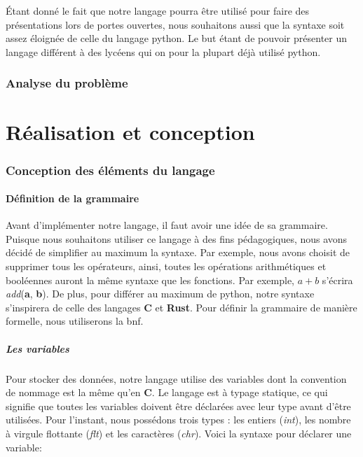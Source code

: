 \documentclass[a4paper]{article}%
\begin{document}
Étant donné le fait que notre langage pourra être utilisé pour faire des
présentations lors de portes ouvertes, nous souhaitons aussi que la syntaxe soit
assez éloignée de celle du langage python. Le but étant de pouvoir présenter
un langage différent à des lycéens qui on pour la plupart déjà utilisé python.

\section{Analyse du problème}

\part{Réalisation et conception}

\section{Conception des éléments du langage}

\subsection{Définition de la grammaire}

Avant d'implémenter notre langage, il faut avoir une idée de sa grammaire.
Puisque nous souhaitons utiliser ce langage à des fins pédagogiques, nous avons
décidé de simplifier au maximum la syntaxe. Par exemple, nous avons choisit de
supprimer tous les opérateurs, ainsi, toutes les opérations arithmétiques et
booléennes auront la même syntaxe que les fonctions. Par exemple, $a+b$ s'écrira
\textit{add}(\textbf{a}, \textbf{b}). De plus, pour différer au maximum de
python, notre syntaxe s'inspirera de celle des langages \textbf{C} et
\textbf{Rust}. Pour définir la grammaire de manière formelle, nous utiliserons
la \gls{bnf}.

\subsubsection*{Les variables}

Pour stocker des données, notre langage utilise des variables dont la
convention de nommage est la même qu'en \textbf{C}. Le langage est à typage
statique, ce qui signifie que toutes les variables doivent être déclarées avec
leur type avant d'être utilisées. Pour l'instant, nous possédons trois types :
les entiers (\textit{int}), les nombre à virgule flottante (\textit{flt}) et les
caractères (\textit{chr}). Voici la syntaxe pour déclarer une variable:
\end{document}
